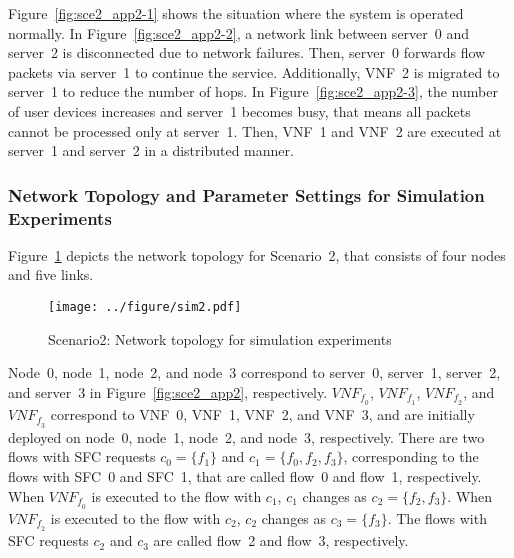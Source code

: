 \documentclass[technicalreport]{ieicej}
\begin{document}
	Figure~\ref{fig:sce2_app2-1} shows the situation where the system is operated normally.
	In Figure~\ref{fig:sce2_app2-2}, a network link between server~0 and server~2 is disconnected due to network failures.
	Then, server~0 forwards flow packets via server~1 to continue the service.
	Additionally, VNF~2 is migrated to server~1 to reduce the number of hops.
	In Figure~\ref{fig:sce2_app2-3}, the number of user devices increases and server~1 becomes busy, that means all packets cannot be processed only at server~1.
	Then, VNF~1 and VNF~2 are executed at server~1 and server~2 in a distributed manner.

	\subsubsection{Network Topology and Parameter Settings for Simulation Experiments}
	Figure~\ref{fig:sce2_topology} depicts the network topology for Scenario~2, that consists of four nodes and five links.
	\begin{figure}[!t]
		\centering
		\texttt{[image: ../figure/sim2.pdf]}
		\caption{Scenario2: Network topology for simulation experiments}
		\label{fig:sce2_topology}
	\end{figure}
	Node~0, node~1, node~2, and node~3 correspond to server~0, server~1, server~2, and server~3 in Figure~\ref{fig:sce2_app2}, respectively.
	$\mathit{VNF_{f_0}}$, $\mathit{VNF_{f_1}}$, $\mathit{VNF_{f_2}}$, and $\mathit{VNF_{f_3}}$ correspond to VNF~0, VNF~1, VNF~2, and VNF~3, and are initially deployed on node~0, node~1, node~2, and node~3, respectively.
	There are two flows with SFC requests $c_0 = \{f_{1}\}$ and $c_1 = \{f_{0}, f_{2}, f_{3}\}$, corresponding to the flows with SFC~0 and SFC~1, that are called flow~0 and flow~1, respectively.
	When $\mathit{VNF_{f_0}}$ is executed to the flow with $c_1$, $c_1$ changes as $c_2 = \{f_{2}, f_{3}\}$.
	When $\mathit{VNF_{f_2}}$ is executed to the flow with $c_2$, $c_2$ changes as $c_3 = \{f_{3}\}$.
	The flows with SFC requests $c_2$ and $c_3$ are called flow~2 and flow~3, respectively.
\end{document}
